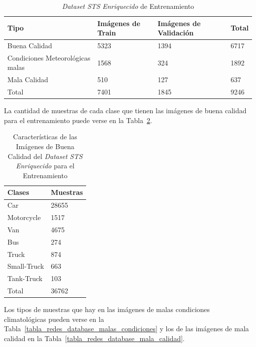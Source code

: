 \begin{table}[H]
\begin{center}
\begin{tabular}{|l|l|l|l|}
\hline
Tipo  & Imágenes de Train & Imágenes de Validación & Total \\
\hline \hline
Buena Calidad & 5323 &  1394 & 6717 \\ \hline
Condiciones Meteorológicas malas & 1568 & 324 & 1892 \\ \hline
Mala Calidad & 510 & 127 & 637 \\ \hline
Total & 7401 & 1845 & 9246 \\ \hline
\end{tabular}
\caption{\textit{Dataset STS Enriquecido} de Entrenamiento}
\label{base_datos_final_train}
\end{center}
\end{table}

La cantidad de muestras de cada clase que tienen las imágenes de buena calidad para el entrenamiento puede verse en la Tabla~\ref{tabla_redes_database_mayor}. 

\begin{table}[H]
\begin{center}
\begin{tabular}{|l|l|}
\hline
Clases & Muestras \\
\hline \hline
Car & 28655 \\ \hline
Motorcycle & 1517 \\ \hline
Van & 4675 \\ \hline
Bus & 274 \\ \hline
Truck & 874 \\ \hline
Small-Truck & 663 \\ \hline
Tank-Truck & 103 \\ \hline
Total & 36762 \\ \hline
\end{tabular}
\caption{Características de las Imágenes de Buena Calidad del \textit{Dataset STS Enriquecido} para el Entrenamiento}
\label{tabla_redes_database_mayor}
\end{center}
\end{table}

Los tipos de muestras que hay en las imágenes de malas condiciones climatológicas pueden verse en la Tabla~\ref{tabla_redes_database_malas_condiciones} y los de las imágenes de mala calidad en la Tabla~\ref{tabla_redes_database_mala_calidad}.

